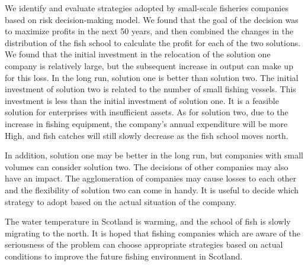 \documentclass{mcmthesis}
\numberwithin{figure}{section}
\numberwithin{table}{section}
\begin{document}
We identify and evaluate strategies adopted by small-scale fisheries companies based on  risk decision-making model. We found that the goal of the decision was to maximize profits in the next 50 years, and then combined the changes in the distribution of the fish school to calculate the profit for each of the two solutions. We found that the initial investment in the relocation of the solution one company is relatively large, but the subsequent increase in output can make up for this loss. In the long run, solution one is better than solution two. The initial investment of solution two is related to the number of small fishing vessels. This investment is less than the initial investment of solution one. It is a feasible solution for enterprises with insufficient assets. As for solution two, due to the increase in fishing equipment, the company's annual  expenditure will be more High, and fish catches will still slowly decrease as the fish school moves north. 

In addition, solution one may be better in the long run, but companies with small volumes can consider solution two. The decisions of other companies may also have an impact. The agglomeration of companies may cause losses to each other and the flexibility of solution two can come in handy. It is useful to decide which strategy to adopt based on the actual situation of the company.

The water temperature in Scotland is warming, and the school of fish is slowly migrating to the north. It is hoped that fishing companies which are aware of the seriousness of the problem can choose appropriate strategies based on actual conditions to improve the future fishing environment in Scotland.

\newpage
{}


\end{document}
